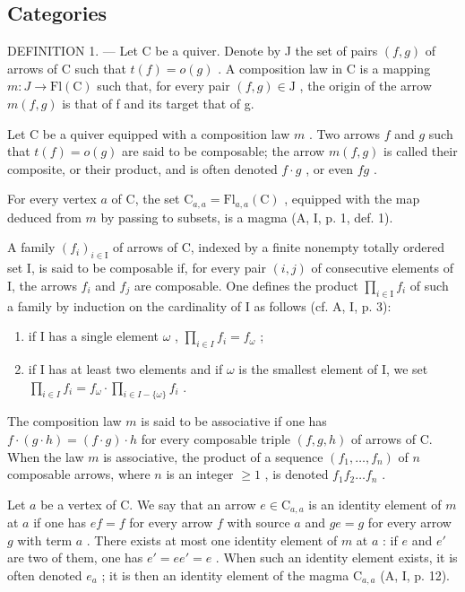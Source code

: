 \subsection{Categories}

DEFINITION 1. --- Let C be a quiver. Denote by J the set of pairs \((f,g)\) of arrows of C such that \(t(f)=o(g)\) . A composition law in C is a mapping \(m:J\to\mathrm{Fl}(\mathrm{C})\) such that, for every pair \((f,g)\in\mathrm{J}\) , the origin of the arrow \(m(f,g)\) is that of f and its target that of g.

Let C be a quiver equipped with a composition law \(m\) . Two arrows \(f\) and \(g\) such that \(t(f) = o(g)\) are said to be composable; the arrow \(m(f, g)\) is called their composite, or their product, and is often denoted \(f \cdot g\) , or even \(fg\) .

For every vertex \(a\) of C, the set \(\mathrm{C}_{a,a} = \mathrm{Fl}_{a,a}(\mathrm{C})\) , equipped with the map deduced from \(m\) by passing to subsets, is a magma (A, I, p. 1, def. 1).

A family \((f_{i})_{i\in\mathrm{I}}\) of arrows of C, indexed by a finite nonempty totally ordered set I, is said to be composable if, for every pair \((i,j)\) of consecutive elements of I, the arrows \(f_{i}\) and \(f_{j}\) are composable. One defines the product \(\prod_{i\in\mathrm{I}}f_{i}\) of such a family by induction on the cardinality of I as follows (cf. A, I, p. 3):

\begin{enumerate}
\def\labelenumi{(\roman{enumi})}
\item
  if I has a single element \(\omega\) , \(\prod_{i\in I}f_i = f_\omega\) ;
\item
  if I has at least two elements and if \(\omega\) is the smallest element of I, we set \(\prod_{i\in I}f_i = f_\omega \cdot \prod_{i\in I - \{\omega \}}f_i\) .
\end{enumerate}

The composition law \(m\) is said to be associative if one has \(f \cdot (g \cdot h) = (f \cdot g) \cdot h\) for every composable triple \((f, g, h)\) of arrows of C. When the law \(m\) is associative, the product of a sequence \((f_1, \ldots, f_n)\) of \(n\) composable arrows, where \(n\) is an integer \(\geqslant 1\) , is denoted \(f_1 f_2 \ldots f_n\) .

Let \(a\) be a vertex of C. We say that an arrow \(e \in \mathrm{C}_{a,a}\) is an identity element of \(m\) at \(a\) if one has \(ef = f\) for every arrow \(f\) with source \(a\) and \(ge = g\) for every arrow \(g\) with term \(a\) . There exists at most one identity element of \(m\) at \(a\) : if \(e\) and \(e'\) are two of them, one has \(e' = ee' = e\) . When such an identity element exists, it is often denoted \(e_a\) ; it is then an identity element of the magma \(\mathrm{C}_{a,a}\) (A, I, p. 12).


